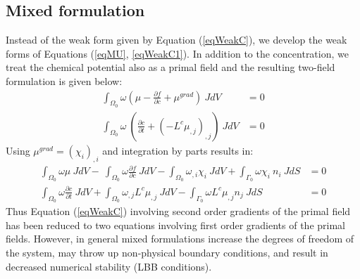 \subsection{Mixed formulation}
Instead of the weak form given by Equation (\ref{eqWeakC}), we develop the weak forms of Equations  (\ref{eqMU}, \ref{eqWeakC1}). In addition to the concentration, we treat the chemical potential also as a primal field and the resulting two-field formulation is given below:
\begin{align}
\int_{\Omega_0}  \omega (\mu - \frac{\partial f}{\partial c}  + \mu^{grad}) ~J dV &=0 \\
\int_{\Omega_0}  \omega ~\left(  \frac{\partial  c }{\partial t} + \left(-L^c \mu_{,j} \right)_{,j} \right) ~J dV &= 0
\end{align}
Using $\mu^{grad} = (\chi_i)_{,i}$ and integration by parts results in:
\begin{align}
\int_{\Omega_0}  \omega \mu ~J dV - ~\int_{\Omega_0}  \omega \frac{\partial f}{\partial c} ~J dV  - \int_{\Omega_0}  \omega_{,i} \chi_i ~J dV +  \int_{\Gamma_0}  \omega \chi_i ~n_i ~J dS &=0 \\
\int_{\Omega_0}  \omega \frac{\partial c }{\partial t} ~J dV  + \int_{\Omega_0} \omega_{,j} L^{c} \mu_{,j} ~J dV - \int_{\Gamma_0}  \omega L^{c} \mu_{,j} n_j ~J dS &=0
\end{align}
Thus Equation (\ref{eqWeakC}) involving second order gradients of the primal field has been reduced to two equations involving first order gradients of the primal fields. However, in general mixed formulations increase the degrees of freedom of the system, may throw up non-physical boundary conditions, and result in decreased numerical stability (LBB conditions). 



